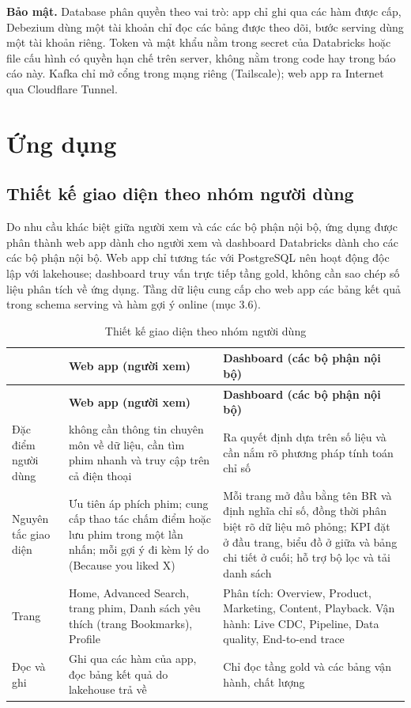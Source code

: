 \documentclass[a4paper,11pt]{article}
\newlength{\reporttablewidth}
\begin{document}
\textbf{Bảo mật.} Database phân quyền theo vai trò: app chỉ ghi qua các hàm được cấp, Debezium dùng một tài khoản chỉ đọc các bảng được theo dõi, bước serving dùng một tài khoản riêng. Token và mật khẩu nằm trong secret của Databricks hoặc file cấu hình có quyền hạn chế trên server, không nằm trong code hay trong báo cáo này. Kafka chỉ mở cổng trong mạng riêng (Tailscale); web app ra Internet qua Cloudflare Tunnel.
\section{Ứng dụng}\label{sec:4}

\subsection{Thiết kế giao diện theo nhóm người dùng}\label{sec:4.1}

Do nhu cầu khác biệt giữa người xem và các các bộ phận nội bộ, ứng dụng được phân thành web app dành cho người xem và dashboard Databricks dành cho các các bộ phận nội bộ. Web app chỉ tương tác với PostgreSQL nên hoạt động độc lập với lakehouse; dashboard truy vấn trực tiếp tầng gold, không cần sao chép số liệu phân tích về ứng dụng. Tầng dữ liệu cung cấp cho web app các bảng kết quả trong schema serving và hàm gợi ý online (mục 3.6).

\begingroup
\small
{}
\setlength{\tabcolsep}{4pt}
\renewcommand{\arraystretch}{1.18}
\setlength{\reporttablewidth}{\dimexpr\linewidth-4\tabcolsep\relax}
\begin{longtable}{@{}L{0.22\reporttablewidth} L{0.38\reporttablewidth} L{0.40\reporttablewidth}@{}}
\caption[Thiết kế giao diện theo nhóm người dùng (mục 4.1)]{Thiết kế giao diện theo nhóm người dùng}\label{tab:15} \\
\toprule
 & \textbf{Web app (người xem)} & \textbf{Dashboard (các bộ phận nội bộ)} \\
\midrule
\endfirsthead
\toprule
 & \textbf{Web app (người xem)} & \textbf{Dashboard (các bộ phận nội bộ)} \\
\midrule
\endhead
\midrule
\endfoot
\bottomrule
\endlastfoot
Đặc điểm người dùng & không cần thông tin chuyên môn về dữ liệu, cần tìm phim nhanh và truy cập trên cả điện thoại & Ra quyết định dựa trên số liệu và cần nắm rõ phương pháp tính toán chỉ số \\
Nguyên tắc giao diện & Ưu tiên áp phích phim; cung cấp thao tác chấm điểm hoặc lưu phim trong một lần nhấn; mỗi gợi ý đi kèm lý do (\textquotedbl{}Because you liked X\textquotedbl{}) & Mỗi trang mở đầu bằng tên BR và định nghĩa chỉ số, đồng thời phân biệt rõ dữ liệu mô phỏng; KPI đặt ở đầu trang, biểu đồ ở giữa và bảng chi tiết ở cuối; hỗ trợ bộ lọc và tải danh sách \\
Trang & Home, Advanced Search, trang phim, Danh sách yêu thích (trang Bookmarks), Profile & Phân tích: Overview, Product, Marketing, Content, Playback. Vận hành: Live CDC, Pipeline, Data quality, End-to-end trace \\
Đọc và ghi & Ghi qua các hàm của app, đọc bảng kết quả do lakehouse trả về & Chỉ đọc tầng gold và các bảng vận hành, chất lượng \\
\end{longtable}
\endgroup
\end{document}
